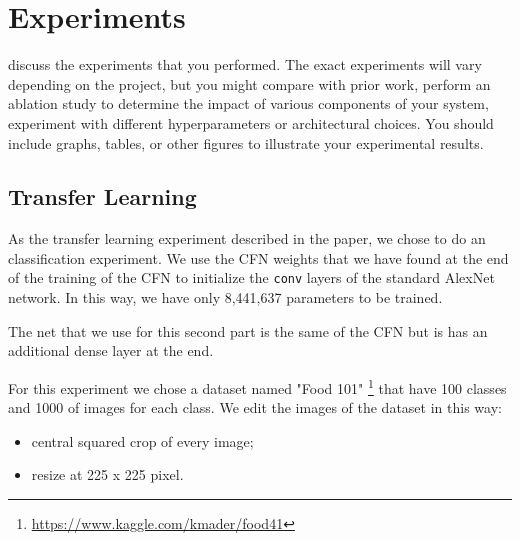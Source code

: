 \section{Experiments}
discuss the experiments that you performed. The exact experiments will vary depending on the project, but you might compare with prior work, perform an ablation study to determine the impact of various components of your system, experiment with different hyperparameters or architectural choices. You should include graphs, tables, or other figures to illustrate your experimental results.

\subsection{Transfer Learning}
As the transfer learning experiment described in the paper, we chose to do an classification experiment. We use the CFN weights that we have found at the end of the training of the CFN to initialize the \texttt{conv} layers of the standard AlexNet network. In this way, we have only 8,441,637 parameters to be trained.

The net that we use for this second part is the same of the CFN but is has an additional dense layer at the end.

For this experiment we chose a dataset named "Food 101" \footnote{\url{https://www.kaggle.com/kmader/food41}} that have 100 classes and 1000 of images for each class. We edit the images of the dataset in this way:

\begin{itemize}
	\item central squared crop of every image;
	\item resize at 225 x 225 pixel.
\end{itemize}



